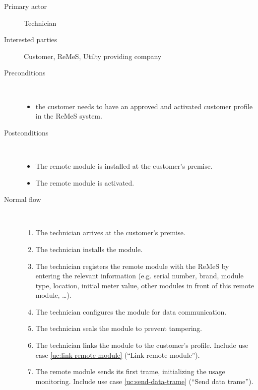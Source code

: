 \begin{description}
	\item[Primary actor] Technician
	\item[Interested parties] Customer, ReMeS, Utilty providing company
	\item[Preconditions] \ 
	\begin{itemize}
	  	\item the customer needs to have an approved and activated customer profile
	  	in the ReMeS system.
	\end{itemize}
	\item[Postconditions] \ 
	\begin{itemize}
		\item The remote module is installed at the customer's premise.
		\item The remote module is activated.  
	\end{itemize}
	\item[Normal flow] \ 
	\begin{enumerate}
		\item The technician arrives at the customer's premise.
		\item The technician installs the module.
		\item The technician registers the remote module with the ReMeS by entering
		the relevant information (e.g. serial number, brand, module type, location,
		initial meter value, other modules in front of this remote module, \ldots).
		\item The technician configures the module for data communication.
		\item The technician seals the module to prevent tampering.
		\item The technician links the module to the customer's profile. Include use
		case \ref{uc:link-remote-module} (``Link remote module'').
		\item The remote module sends its first trame, initializing the usage
		monitoring. Include use case \ref{uc:send-data-trame} (``Send data trame'').
	\end{enumerate}
\end{description}